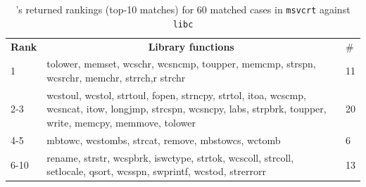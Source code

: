 \vspace{2mm}
\noindent{}



\begin{table}[t]
\scriptsize
\centering
\caption{\tool's returned rankings (top-10 matches) for 60 matched cases in \texttt{msvcrt} against \texttt{libc}}
\label{tab:cross-os}
\begin{tabular}{@{}lll@{}}
\multicolumn{1}{c}{\textbf{Rank}}    & \multicolumn{1}{c}{\textbf{Library functions}}   & \#                       \\ \cmidrule(l){1-3}
\multicolumn{1}{l|}{1}      & \multicolumn{1}{l|}{\parbox{6cm}{tolower, memset, wcschr, wcsncmp, toupper, memcmp, strspn, wcsrchr, memchr, strrch,r strchr}}                                                              & \multicolumn{1}{l}{11}  \\ \cmidrule(l){1-3}
\multicolumn{1}{l|}{2-3}    & \multicolumn{1}{l|}{\parbox{6cm}{wcstoul, wcstol, strtoul, fopen, strncpy, strtol, itoa, wcscmp, wcsncat, itow, longjmp, strcspn, wcsncpy, labs, strpbrk, toupper, write, memcpy, memmove, tolower}} & \multicolumn{1}{l}{20} \\ \cmidrule(l){1-3}
\multicolumn{1}{l|}{4-5}    & \multicolumn{1}{l|}{\parbox{6cm}{mbtowc, wcstombs, strcat, remove, mbstowcs, wctomb}}                                                                                                   & \multicolumn{1}{l}{6}  \\ \cmidrule(l){1-3}
\multicolumn{1}{l|}{6-10}   & \multicolumn{1}{l|}{\parbox{6cm}{rename, strstr, wcspbrk, iswctype, strtok, wcscoll, strcoll, setlocale, qsort, wcsspn, swprintf, wcstod, strerrorr}}                                         & \multicolumn{1}{l}{13}  \\ \cmidrule(l){1-3}

\end{tabular}
\end{table}
